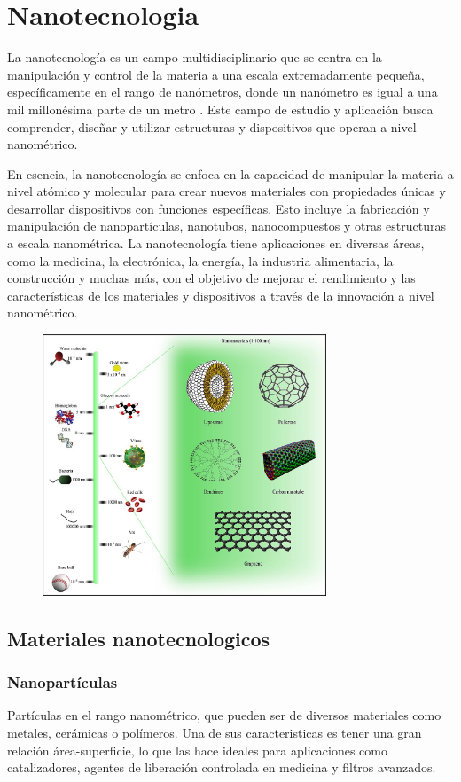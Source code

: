 \section{Nanotecnologia}
La nanotecnología es un campo multidisciplinario que se centra en la manipulación y control de la materia a una escala extremadamente pequeña, específicamente en el rango de nanómetros, donde un nanómetro es igual a una mil millonésima parte de un metro \cite{nanotecnologia}. Este campo de estudio y aplicación busca comprender, diseñar y utilizar estructuras y dispositivos que operan a nivel nanométrico.

En esencia, la nanotecnología se enfoca en la capacidad de manipular la materia a nivel atómico y molecular para crear nuevos materiales con propiedades únicas y desarrollar dispositivos con funciones específicas. Esto incluye la fabricación y manipulación de nanopartículas, nanotubos, nanocompuestos y otras estructuras a escala nanométrica. La nanotecnología tiene aplicaciones en diversas áreas, como la medicina, la electrónica, la energía, la industria alimentaria, la construcción y muchas más, con el objetivo de mejorar el rendimiento y las características de los materiales y dispositivos a través de la innovación a nivel nanométrico.

    \begin{figure}[h]
        \centering
        \includegraphics[height=7.8cm]{assets/figures/NAN.jpg}          
    \end{figure}

\subsection{Materiales nanotecnologicos}
    \subsubsection{Nanopartículas}
    Partículas en el rango nanométrico, que pueden ser de diversos materiales como metales, cerámicas o polímeros. Una de sus caracteristicas es tener una gran relación área-superficie, lo que las hace ideales para aplicaciones como catalizadores, agentes de liberación controlada en medicina y filtros avanzados.
